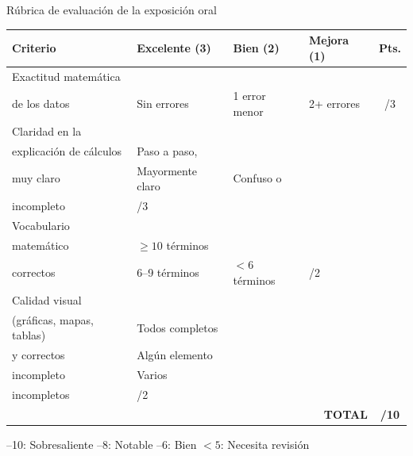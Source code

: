 \documentclass[aspectratio=169, 10pt, spanish]{beamer}
\begin{document}

\begin{frame}{Rúbrica de evaluación de la exposición oral}
  \begin{center}
  \AlmFontFootnote
  \begin{tabular}{p{3.5cm} p{2.2cm} p{2.2cm} p{2.2cm} c}
    \toprule
    \textbf{Criterio} & \textbf{Excelente (3)} & \textbf{Bien (2)}
      & \textbf{Mejora (1)} & \textbf{Pts.}\\
    \midrule
    Exactitud matemática\\de los datos
      & Sin errores
      & 1 error menor
      & 2+ errores
      & /3\\[4pt]
    Claridad en la\\explicación de cálculos
      & Paso a paso,\\muy claro
      & Mayormente claro
      & Confuso o\\incompleto
      & /3\\[4pt]
    Vocabulario\\matemático
      & $\geq 10$ términos\\correctos
      & 6--9 términos
      & $<6$ términos
      & /2\\[4pt]
    Calidad visual\\(gráficas, mapas, tablas)
      & Todos completos\\y correctos
      & Algún elemento\\incompleto
      & Varios\\incompletos
      & /2\\
    \midrule
    \multicolumn{4}{r}{\textbf{TOTAL}} & \textbf{/10}\\
    \bottomrule
  \end{tabular}
  \end{center}
  \vspace{4pt}
  \begin{center}
    {--10: Sobresaliente --8: Notable --6: Bien \quad $<5$: Necesita revisión}
  \end{center}
\end{frame}

\end{document}
